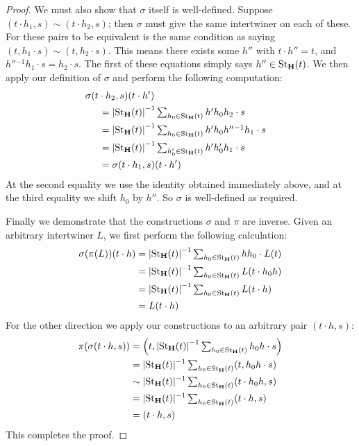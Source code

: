 \documentclass[a4paper,12pt]{article}
\theoremstyle{definition}
\newcommand\cat[1]{{\ensuremath{\bf #1}}}
\renewcommand{\-}[0]{\nobreakdash-\hspace{0pt}}
\newcommand\Stab{\ensuremath{\mathrm{St}}}
\begin{document}
\begin{proof}
We must also show that $\sigma$ itself is well-defined. Suppose $(t \cdot h_1, s) \sim (t \cdot h_2, s)$; then $\sigma$ must give the same intertwiner on each of these. For these pairs to be equivalent is the same condition as saying $(t,h_1 \cdot s) \sim (t, h_2 \cdot s)$. This means there exists some $h''$ with $t \cdot h'' = t$, and $h'' {}^{-1} h_1 \cdot s = h_2 \cdot s$. The first of these equations simply says $h'' \in \Stab _{\cat H} (t)$. We then apply our definition of $\sigma$ and perform the following computation:
\begin{align*}
\sigma (t \cdot h_2, s)(t \cdot h')
\hspace{-2cm}
\\
&=
\textstyle {|\Stab_{\cat H} (t)|} ^{-1}
\sum _{h_0 \in \Stab _{\cat H} (t)} h' h_0 h_2 \cdot s
\\
&=
\textstyle {|\Stab_{\cat H} (t)|} ^{-1}
\sum _{h_0 \in \Stab _{\cat H} (t)} h' h_0 h'' {}^{-1} h_1 \cdot s
\\
&=
\textstyle {|\Stab_{\cat H} (t)|} ^{-1}
\sum _{h' _0 \in \Stab _{\cat H} (t)} h' h'_0 h_1 \cdot s
\\
&= \sigma (t \cdot h_1, s)(t \cdot h')
\end{align*}
At the second equality we use the identity obtained immediately above, and at the third equality we shift $h_0$ by $h''$. So $\sigma$ is well-defined as required.

Finally we demonstrate that the constructions $\sigma$ and $\pi$ are inverse. Given an arbitrary intertwiner $L$, we first perform the following calculation:
\begin{align*}
\sigma (\pi (L))(t \cdot h)
&=
{|\Stab_{\cat H} (t)|} ^{-1}
\textstyle\sum _{h_0 \in \Stab _{\cat H} (t)} h h_0 \cdot L(t)
\\
&=
{|\Stab_{\cat H} (t)|} ^{-1}
\textstyle\sum _{h_0 \in \Stab _{\cat H} (t)}  L(t \cdot h_0 h)
\\
&=
{|\Stab_{\cat H} (t)|} ^{-1}
\textstyle\sum _{h_0 \in \Stab _{\cat H} (t)} L(t \cdot h)
\\
&= L(t \cdot h)
\end{align*}
For the other direction we apply our constructions to an arbitrary pair $(t \cdot h, s)$:
\begin{align*}
\pi(\sigma(t \cdot h, s))
&= \left( t, {|\Stab_{\cat H} (t)|} ^{-1}
\textstyle\sum _{h_0 \in \Stab _{\cat H} (t)} h_0 h \cdot s \right) 
\\
&= | \Stab_{\cat{H}}(t) | ^{-1} \textstyle\sum _{h_0 \in \Stab _{\cat H} (t)} ( t, h_0 h \cdot s)
\\
&\sim | \Stab_{\cat{H}}(t) | ^{-1} \textstyle\sum _{h_0 \in \Stab _{\cat H} (t)} ( t \cdot h_0 h, s)
\\
&= | \Stab_{\cat{H}}(t) | ^{-1} \textstyle\sum _{h_0 \in \Stab _{\cat H} (t)} ( t \cdot h, s)
\\
&= (t \cdot h, s)
\end{align*}
This completes the proof.
\end{proof}
\end{document}

